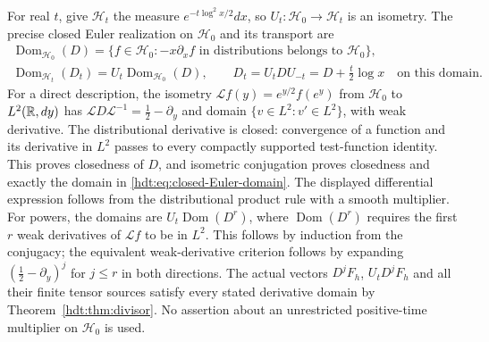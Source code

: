 \documentclass[11pt]{article}
\begin{document}
For real $t$, give $\mathcal H_t$ the measure
$e^{-t\log^2x/2}dx$, so $U_t:\mathcal H_0\to\mathcal H_t$ is an isometry.
The precise closed Euler realization on $\mathcal H_0$ and its transport are
\begin{equation}\label{hdt:eq:closed-Euler-domain}
\begin{gathered}
\operatorname{Dom}_{\mathcal H_0}(D)=
\{f\in\mathcal H_0:-x\partial_xf\text{ in distributions belongs to }\mathcal H_0\},\\
\operatorname{Dom}_{\mathcal H_t}(D_t)=U_t\operatorname{Dom}_{\mathcal H_0}(D),
\qquad D_t=U_tDU_{-t}=D+\tfrac t2\log x
\quad\text{on this domain}.
\end{gathered}
\end{equation}
For a direct description, the isometry
$\mathcal Lf(y)=e^{y/2}f(e^y)$ from $\mathcal H_0$ to $L^2(\mathbb R,dy)$
has $\mathcal L D\mathcal L^{-1}=\tfrac12-\partial_y$ and
domain $\{v\in L^2:v'\in L^2\}$, with weak derivative.
The distributional derivative is closed: convergence of a function
and its derivative in $L^2$ passes to every compactly supported
test-function identity. This proves closedness of $D$, and isometric
conjugation proves closedness and exactly the domain in
\eqref{hdt:eq:closed-Euler-domain}. The displayed differential expression
follows from the distributional product rule with a smooth multiplier.
For powers, the domains are $U_t\operatorname{Dom}(D^r)$, where
$\operatorname{Dom}(D^r)$ requires the first $r$ weak derivatives of
$\mathcal Lf$ to be in $L^2$. This follows by induction from the
conjugacy; the equivalent weak-derivative criterion follows by
expanding $(\tfrac12-\partial_y)^j$ for $j\leq r$ in both
directions. The actual vectors $D^jF_h$, $U_tD^jF_h$ and all their
finite tensor sources satisfy every stated derivative domain by
Theorem~\ref{hdt:thm:divisor}. No assertion about an unrestricted
positive-time multiplier on $\mathcal H_0$ is used.
\end{document}
